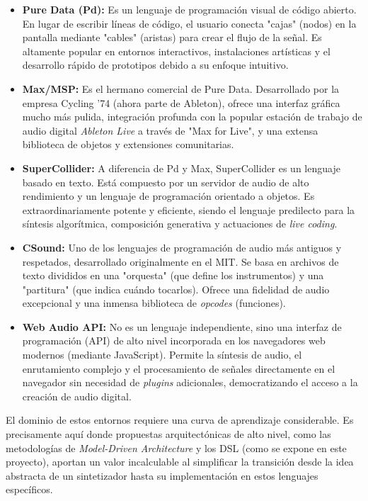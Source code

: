 \begin{itemize}
    \item \textbf{Pure Data (Pd):} Es un lenguaje de programación visual de código abierto. En lugar de escribir líneas de código, el usuario conecta "cajas" (nodos) en la pantalla mediante "cables" (aristas) para crear el flujo de la señal. Es altamente popular en entornos interactivos, instalaciones artísticas y el desarrollo rápido de prototipos debido a su enfoque intuitivo.
    \item \textbf{Max/MSP:} Es el hermano comercial de Pure Data. Desarrollado por la empresa Cycling '74 (ahora parte de Ableton), ofrece una interfaz gráfica mucho más pulida, integración profunda con la popular estación de trabajo de audio digital \textit{Ableton Live} a través de "Max for Live", y una extensa biblioteca de objetos y extensiones comunitarias.
    \item \textbf{SuperCollider:} A diferencia de Pd y Max, SuperCollider es un lenguaje basado en texto. Está compuesto por un servidor de audio de alto rendimiento y un lenguaje de programación orientado a objetos. Es extraordinariamente potente y eficiente, siendo el lenguaje predilecto para la síntesis algorítmica, composición generativa y actuaciones de \textit{live coding}.
    \item \textbf{CSound:} Uno de los lenguajes de programación de audio más antiguos y respetados, desarrollado originalmente en el MIT. Se basa en archivos de texto divididos en una "orquesta" (que define los instrumentos) y una "partitura" (que indica cuándo tocarlos). Ofrece una fidelidad de audio excepcional y una inmensa biblioteca de \textit{opcodes} (funciones).
    \item \textbf{Web Audio API:} No es un lenguaje independiente, sino una interfaz de programación (API) de alto nivel incorporada en los navegadores web modernos (mediante JavaScript). Permite la síntesis de audio, el enrutamiento complejo y el procesamiento de señales directamente en el navegador sin necesidad de \textit{plugins} adicionales, democratizando el acceso a la creación de audio digital.
\end{itemize}

El dominio de estos entornos requiere una curva de aprendizaje considerable. Es precisamente aquí donde propuestas arquitectónicas de alto nivel, como las metodologías de \textit{Model-Driven Architecture} y los DSL (como se expone en este proyecto), aportan un valor incalculable al simplificar la transición desde la idea abstracta de un sintetizador hasta su implementación en estos lenguajes específicos.
